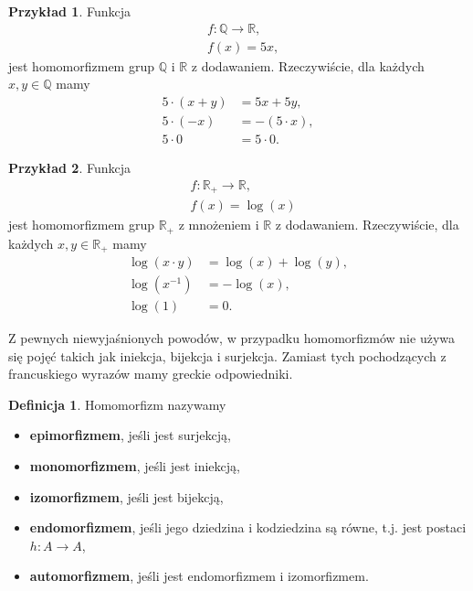 \documentclass{book}
\theoremstyle{definition}
\newtheorem{definition}{Definicja}[section]
\newtheorem{example}{Przykład}[section]
\begin{document}
\begin{example}
	Funkcja
	\begin{align*}
		&f: \mathbb{Q} \to \mathbb{R},\\
		&f(x) = 5x,
	\end{align*}
	jest homomorfizmem grup $\mathbb{Q}$ i $\mathbb{R}$ z dodawaniem.
	Rzeczywiście, dla każdych $x, y \in \mathbb{Q}$ mamy
	\begin{align}
		5 \cdot (x + y) &= 5x + 5y, \\
		5 \cdot (-x) &= -(5 \cdot x), \\
		5 \cdot 0 &= 5 \cdot 0.
	\end{align}
\end{example}

\begin{example}
	Funkcja
	\begin{align*}
		&f: \mathbb{R}_+ \to \mathbb{R}, \\
		&f(x) = \log(x)
	\end{align*}
	jest homomorfizmem grup $\mathbb{R}_+$ z mnożeniem i $\mathbb{R}$ z dodawaniem.
	Rzeczywiście, dla każdych $x, y \in \mathbb{R}_+$ mamy
	\begin{align}
		\log(x \cdot y) &= \log(x) + \log(y), \\
		\log(x^{-1}) &= -\log(x), \\
		\log(1) &= 0.
	\end{align}
\end{example}

Z pewnych niewyjaśnionych powodów,
    w przypadku homomorfizmów nie używa się pojęć takich jak iniekcja, bijekcja i surjekcja.
Zamiast tych pochodzących z francuskiego wyrazów mamy greckie odpowiedniki.

\begin{definition}
    Homomorfizm nazywamy
    \begin{itemize}
        \item \textbf{epimorfizmem}, jeśli jest surjekcją,
        \item \textbf{monomorfizmem}, jeśli jest iniekcją,
        \item \textbf{izomorfizmem}, jeśli jest bijekcją,
        \item \textbf{endomorfizmem}, jeśli jego dziedzina i kodziedzina są równe, t.j. jest postaci $h:A \to A$,
        \item \textbf{automorfizmem}, jeśli jest endomorfizmem i izomorfizmem.
    \end{itemize}
\end{definition}
\end{document}
